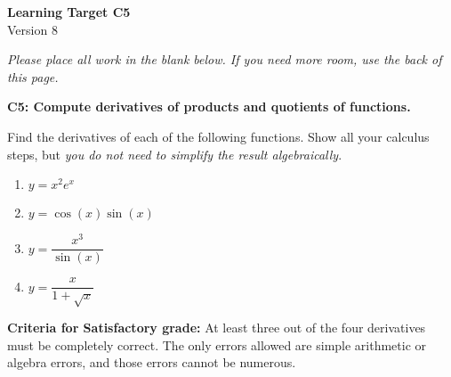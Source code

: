 \documentclass[10pt]{article}
\begin{document}
	\vspace*{0in}

		\begin{center}
			\textbf{Learning Target C5} \\
			{Version 8} \\ %
		\end{center}

\emph{Please place all work in the blank below. If you need more room, use the back of this page.}

\begin{framed}
	\textbf{C5: Compute derivatives of products and quotients of functions.}
\end{framed}

Find the derivatives of each of the following functions. Show all your calculus steps, but \emph{you do not need to simplify the result algebraically}. 

\begin{enumerate}
    \item $y = x^2 e^x$
    \item $y = \cos(x) \sin(x)$
    \item $y = \dfrac{x^3}{\sin(x)}$
    \item $y = \dfrac{x}{1+ \sqrt{x}}$
\end{enumerate}

\vfill


\begin{small}
    \begin{framed}
        	\textbf{Criteria for Satisfactory grade:} At least three out of the four derivatives must be completely correct. The only errors allowed are simple arithmetic or algebra errors, and those errors cannot be numerous.
    \end{framed}

\end{small}
\end{document}
